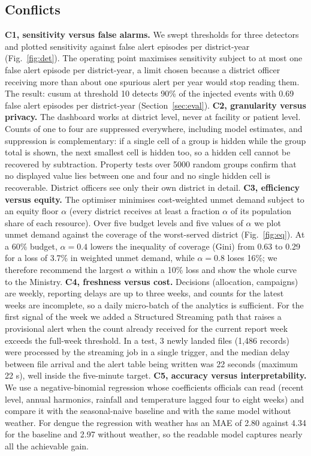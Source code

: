 \documentclass[conference]{IEEEtran}
\begin{document}
\subsection{Conflicts}
\textbf{C1, sensitivity versus false alarms.} We swept thresholds for three detectors and plotted sensitivity against false alert episodes per district-year (Fig.~\ref{fig:det}). The operating point maximises sensitivity subject to at most one false alert episode per district-year, a limit chosen because a district officer receiving more than about one spurious alert per year would stop reading them. The result: cusum at threshold 10 detects 90\% of the injected events with 0.69 false alert episodes per district-year (Section~\ref{sec:eval}).
\textbf{C2, granularity versus privacy.} The dashboard works at district level, never at facility or patient level. Counts of one to four are suppressed everywhere, including model estimates, and suppression is complementary: if a single cell of a group is hidden while the group total is shown, the next smallest cell is hidden too, so a hidden cell cannot be recovered by subtraction. Property tests over 5000 random groups confirm that no displayed value lies between one and four and no single hidden cell is recoverable. District officers see only their own district in detail.
\textbf{C3, efficiency versus equity.} The optimiser minimises cost-weighted unmet demand subject to an equity floor $\alpha$ (every district receives at least a fraction $\alpha$ of its population share of each resource). Over five budget levels and five values of $\alpha$ we plot unmet demand against the coverage of the worst-served district (Fig.~\ref{fig:eq}). At a 60\% budget, $\alpha=0.4$ lowers the inequality of coverage (Gini) from 0.63 to 0.29 for a loss of 3.7\% in weighted unmet demand, while $\alpha=0.8$ loses 16\%; we therefore recommend the largest $\alpha$ within a 10\% loss and show the whole curve to the Ministry.
\textbf{C4, freshness versus cost.} Decisions (allocation, campaigns) are weekly, reporting delays are up to three weeks, and counts for the latest weeks are incomplete, so a daily micro-batch of the analytics is sufficient. For the first signal of the week we added a Structured Streaming path that raises a provisional alert when the count already received for the current report week exceeds the full-week threshold. In a test, 3 newly landed files (1,486 records) were processed by the streaming job in a single trigger, and the median delay between file arrival and the alert table being written was 22 seconds (maximum 22 s), well inside the five-minute target.
\textbf{C5, accuracy versus interpretability.} We use a negative-binomial regression whose coefficients officials can read (recent level, annual harmonics, rainfall and temperature lagged four to eight weeks) and compare it with the seasonal-naive baseline and with the same model without weather. For dengue the regression with weather has an MAE of 2.80 against 4.34 for the baseline and 2.97 without weather, so the readable model captures nearly all the achievable gain.
\end{document}
